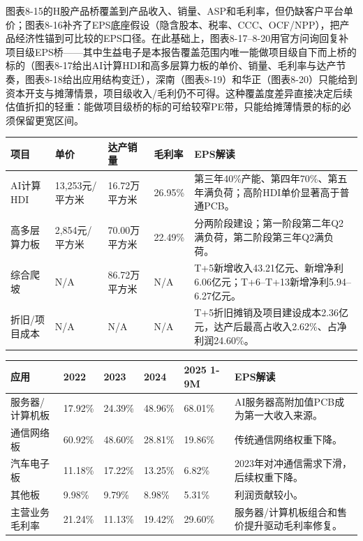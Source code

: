 图表8-15的H股产品桥覆盖到产品收入、销量、ASP和毛利率，但仍缺客户平台单价；图表8-16补齐了EPS底座假设（隐含股本、税率、CCC、OCF/NPP），把产品经济性锚到可比较的EPS口径。在此基础上，图表8-17--8-20用官方问询回复补项目级EPS桥——其中生益电子是本报告覆盖范围内唯一能做项目级自下而上桥的标的（图表8-17给出AI计算HDI和高多层算力板的单价、销量、毛利率与达产节奏，图表8-18给出应用结构变迁），深南（图表8-19）和华正（图表8-20）只能给到资本开支与摊薄情景，项目级收入/毛利仍不可得。这种覆盖度差异直接决定后续估值折扣的轻重：能做项目级桥的标的可给较窄PE带，只能给摊薄情景的标的必须保留更宽区间。

\begin{exhibitbox}[图表8-17：生益电子官方项目级EPS桥]
\footnotesize
\begin{tabularx}{\textwidth}{L{2.4cm}R{1.7cm}R{1.8cm}R{1.8cm}X}
\toprule
\textbf{项目} & \textbf{单价} & \textbf{达产销量} & \textbf{毛利率} & \textbf{EPS解读} \\
\midrule
AI计算HDI & 13,253元/平方米 & 16.72万平方米 & 26.95\% & 第三年40\%产能、第四年70\%、第五年满负荷；高阶HDI单价显著高于普通PCB。 \\
高多层算力板 & 2,854元/平方米 & 70.00万平方米 & 22.49\% & 分两阶段建设；第一阶段第二年Q2满负荷，第二阶段第三年Q2满负荷。 \\
综合爬坡 & N/A & 86.72万平方米 & N/A & T+5新增收入43.21亿元、新增净利6.06亿元；T+6--T+13新增净利5.94--6.27亿元。 \\
折旧/项目成本 & N/A & N/A & N/A & T+5折旧摊销及项目建设成本2.36亿元，达产后最高占收入2.62\%、占净利润24.60\%。 \\
\bottomrule
\end{tabularx}
\end{exhibitbox}

\begin{exhibitbox}[图表8-18：生益电子应用结构和毛利率桥]
\footnotesize
\begin{tabularx}{\textwidth}{L{2.4cm}R{1.5cm}R{1.5cm}R{1.5cm}R{1.7cm}X}
\toprule
\textbf{应用} & \textbf{2022} & \textbf{2023} & \textbf{2024} & \textbf{2025 1-9M} & \textbf{EPS解读} \\
\midrule
服务器/计算机板 & 17.92\% & 24.39\% & 48.96\% & 68.01\% & AI服务器高附加值PCB成为第一大收入来源。 \\
通信网络板 & 60.92\% & 48.60\% & 28.81\% & 19.86\% & 传统通信网络权重下降。 \\
汽车电子板 & 11.18\% & 17.22\% & 13.25\% & 6.82\% & 2023年对冲通信需求下滑，后续权重下降。 \\
其他板 & 9.98\% & 9.79\% & 8.98\% & 5.31\% & 利润贡献较小。 \\
主营业务毛利率 & 21.24\% & 11.13\% & 19.42\% & 29.60\% & 服务器/计算机板组合和售价提升驱动毛利率修复。 \\
\bottomrule
\end{tabularx}
\end{exhibitbox}


